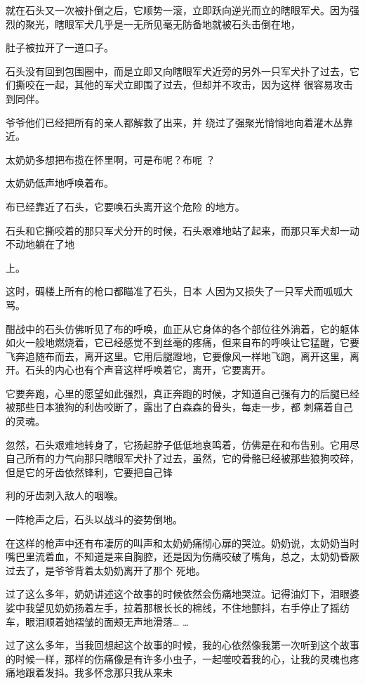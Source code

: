 \documentclass{article}
\begin{document}
就在石头又一次被扑倒之后，它顺势一滚，立即跃向逆光而立的瞎眼军犬。因为强烈的聚光，瞎眼军犬几乎是一无所见毫无防备地就被石头击倒在地，
\newpage

肚子被拉开了一道口子。 

石头没有回到包围圈中，而是立即又向瞎眼军犬近旁的另外一只军犬扑了过去，它们撕咬在一起，其他的军犬立即围了过去，但却并不攻击，因为这样
很容易攻击到同伴。 

爷爷他们已经把所有的亲人都解救了出来，并
绕过了强聚光悄悄地向着灌木丛靠近。 

太奶奶多想把布揽在怀里啊，可是布呢？布呢
？ 


太奶奶低声地呼唤着布。 

布已经靠近了石头，它要唤石头离开这个危险
的地方。 

石头和它撕咬着的那只军犬分开的时候，石头艰难地站了起来，而那只军犬却一动不动地躺在了地

\newpage
上。 

这时，碉楼上所有的枪口都瞄准了石头，日本
人因为又损失了一只军犬而呱呱大骂。 

酣战中的石头仿佛听见了布的呼唤，血正从它身体的各个部位往外淌着，它的躯体如火一般地燃烧着，它已经感觉不到丝毫的疼痛，但来自布的呼唤让它猛醒，它要飞奔追随布而去，离开这里。它用后腿蹬地，它要像风一样地飞跑，离开这里，离开。石头的内心也有个声音这样呼唤着它，离开，它要离开。

它要奔跑，心里的愿望如此强烈，真正奔跑的时候，才知道自己强有力的后腿已经被那些日本狼狗的利齿咬断了，露出了白森森的骨头，每走一步，都
刺痛着自己的灵魂。 

忽然，石头艰难地转身了，它扬起脖子低低地哀鸣着，仿佛是在和布告别。它用尽自己所有的力气向那只瞎眼军犬扑了过去，虽然，它的骨骼已经被那些狼狗咬碎，但是它的牙齿依然锋利，它要把自己锋

\newpage
利的牙齿刺入敌人的咽喉。 


一阵枪声之后，石头以战斗的姿势倒地。 

在这样的枪声中还有布凄厉的叫声和太奶奶痛彻心扉的哭泣。奶奶说，太奶奶当时嘴巴里流着血，不知道是来自胸腔，还是因为伤痛咬破了嘴角，总之，太奶奶昏厥过去了，是爷爷背着太奶奶离开了那个
死地。 


过了这么多年，奶奶讲述这个故事的时候依然会伤痛地哭泣。记得油灯下，泪眼婆娑中我望见奶奶扬着左手，拉着那根长长的棉线，不住地颤抖，右手停止了摇纺车，眼泪顺着她褶皱的面颊无声地滑落…
… 

过了这么多年，当我回想起这个故事的时候，我的心依然像我第一次听到这个故事的时候一样，那样的伤痛像是有许多小虫子，一起噬咬着我的心，让我的灵魂也疼痛地跟着发抖。我多怀念那只我从来未
\end{document}
